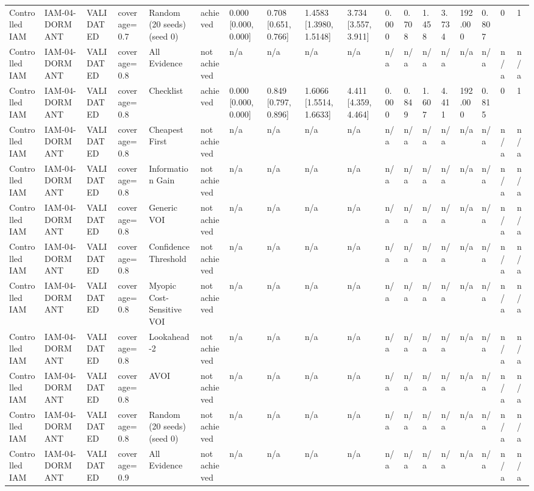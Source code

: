 \begin{table}[!ht]
{\begin{tabular}{llllllllllllllllll}
Controlled IAM & IAM-04-DORMANT & VALIDATED & coverage=0.7 & Random (20 seeds) (seed 0) & achieved & 0.000 [0.000, 0.000] & 0.708 [0.651, 0.766] & 1.4583 [1.3980, 1.5148] & 3.734 [3.557, 3.911] & 0.000 & 0.708 & 1.458 & 3.734 & 192.000 & 0.807 & 0 & 1 \\
Controlled IAM & IAM-04-DORMANT & VALIDATED & coverage=0.8 & All Evidence & not achieved & n/a & n/a & n/a & n/a & n/a & n/a & n/a & n/a & n/a & n/a & n/a & n/a \\
Controlled IAM & IAM-04-DORMANT & VALIDATED & coverage=0.8 & Checklist & achieved & 0.000 [0.000, 0.000] & 0.849 [0.797, 0.896] & 1.6066 [1.5514, 1.6633] & 4.411 [4.359, 4.464] & 0.000 & 0.849 & 1.607 & 4.411 & 192.000 & 0.815 & 0 & 1 \\
Controlled IAM & IAM-04-DORMANT & VALIDATED & coverage=0.8 & Cheapest First & not achieved & n/a & n/a & n/a & n/a & n/a & n/a & n/a & n/a & n/a & n/a & n/a & n/a \\
Controlled IAM & IAM-04-DORMANT & VALIDATED & coverage=0.8 & Information Gain & not achieved & n/a & n/a & n/a & n/a & n/a & n/a & n/a & n/a & n/a & n/a & n/a & n/a \\
Controlled IAM & IAM-04-DORMANT & VALIDATED & coverage=0.8 & Generic VOI & not achieved & n/a & n/a & n/a & n/a & n/a & n/a & n/a & n/a & n/a & n/a & n/a & n/a \\
Controlled IAM & IAM-04-DORMANT & VALIDATED & coverage=0.8 & Confidence Threshold & not achieved & n/a & n/a & n/a & n/a & n/a & n/a & n/a & n/a & n/a & n/a & n/a & n/a \\
Controlled IAM & IAM-04-DORMANT & VALIDATED & coverage=0.8 & Myopic Cost-Sensitive VOI & not achieved & n/a & n/a & n/a & n/a & n/a & n/a & n/a & n/a & n/a & n/a & n/a & n/a \\
Controlled IAM & IAM-04-DORMANT & VALIDATED & coverage=0.8 & Lookahead-2 & not achieved & n/a & n/a & n/a & n/a & n/a & n/a & n/a & n/a & n/a & n/a & n/a & n/a \\
Controlled IAM & IAM-04-DORMANT & VALIDATED & coverage=0.8 & AVOI & not achieved & n/a & n/a & n/a & n/a & n/a & n/a & n/a & n/a & n/a & n/a & n/a & n/a \\
Controlled IAM & IAM-04-DORMANT & VALIDATED & coverage=0.8 & Random (20 seeds) (seed 0) & not achieved & n/a & n/a & n/a & n/a & n/a & n/a & n/a & n/a & n/a & n/a & n/a & n/a \\
Controlled IAM & IAM-04-DORMANT & VALIDATED & coverage=0.9 & All Evidence & not achieved & n/a & n/a & n/a & n/a & n/a & n/a & n/a & n/a & n/a & n/a & n/a & n/a \\

\end{tabular}}
\end{table}
